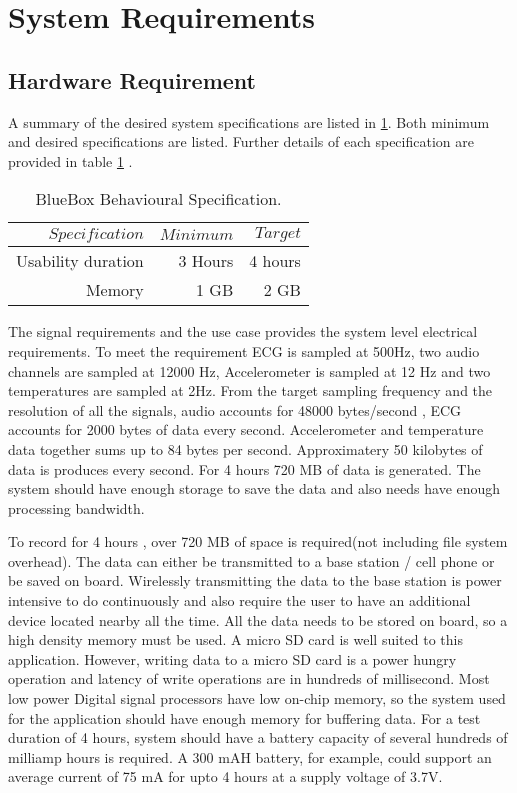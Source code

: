 \section{System Requirements}\label{system requirements}
\subsection{Hardware Requirement}

\hspace{10mm}A summary of the desired system specifications are listed in \ref{table:Behavioural_specs}. Both minimum and desired specifications are listed. Further details of each specification are provided in table \ref{table:Behavioural_specs} .
\begin{table}[h]
	\centering
	\begin{tabular}{|r |r|r|}
		\hline
		$Specification$ & $Minimum$ & $Target$ \\
		\hline
		Usability duration  &  3 Hours & 4 hours \\
		Memory & 1 GB & 2 GB \\
		\hline
	\end{tabular}
	\caption{BlueBox Behavioural Specification.}
	\label{table:Behavioural_specs}
\end{table}

The signal requirements and the use case  provides the system level electrical requirements.  To meet the requirement ECG is sampled at 500Hz, two audio channels are sampled at 12000 Hz, Accelerometer is sampled at 12 Hz and two temperatures are sampled at 2Hz. From the target sampling frequency and the resolution of all the signals, audio accounts for 48000 bytes/second , ECG accounts for 2000 bytes of data every second. Accelerometer and temperature data together sums up to 84 bytes per second. Approximatery 50 kilobytes of data is produces every second. For 4 hours 720 MB of data is generated. The system should have enough storage to save the data and also needs have enough processing bandwidth. 

\hspace{10mm} To record for 4 hours , over 720 MB of space is required(not including file system overhead). The data can either be transmitted to a base station / cell phone or be saved on board. Wirelessly transmitting the data to the base station is power intensive to do continuously and also require the user to have an additional device located nearby all the time. 
All the data needs to be stored on board, so a high density memory must be used. A micro SD card is well suited to this application. However, writing data to a micro SD card is a power hungry operation and latency of write operations are in hundreds of millisecond. Most low power Digital signal processors have low on-chip memory, so the system used for the application should have enough memory for buffering data. For a test duration of 4 hours, system should have a battery capacity of several hundreds of milliamp hours is required. A 300 mAH battery, for example, could support an average current of 75 mA for upto 4 hours at a supply voltage of 3.7V. 

